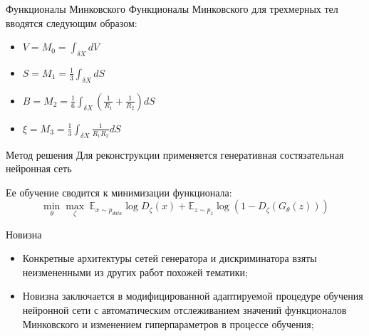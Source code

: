 \documentclass[10pt, handout, aspectratio=169]{beamer}
\begin{document}
	\begin{frame}{Функционалы Минковского}
		Функционалы Минковского для трехмерных тел вводятся следующим образом:
		\begin{itemize}
			\item $ \displaystyle V = M_0 = \int_{\delta X} dV $
			\item $ \displaystyle S = M_1 = \frac{1}{3} \int_{\delta X} dS $
			\item $ \displaystyle B = M_2 = \frac{1}{6} \int_{\delta X} \left ( \frac{1}{R_1} + \frac{1}{R_2} \right ) dS$
			\item $\displaystyle \xi = M_3 = \frac{1}{3} \int_{\delta X} \frac{1}{R_1 R_2} dS $
		\end{itemize}
	\end{frame}

	\begin{frame}{Метод решения}
		Для реконструкции применяется генеративная состязательная нейронная сеть
		\begin{figure}
		\end{figure}
		Ее обучение сводится к минимизации функционала:
		\[ \underset{\theta}{\min} \underset{\zeta}{\max} \ \mathbb{E}_{x \sim p_{data}}\log D_\zeta(x) + \mathbb{E}_{z \sim p_{z}} \log (1 - D_\zeta(G_\theta(z))) \]
	\end{frame}

	\begin{frame}{Новизна}
		\begin{itemize}
			\item Конкретные архитектуры сетей генератора и дискриминатора взяты неизмененными из других работ похожей тематики;
			\item Новизна заключается в модифицированной адаптируемой процедуре обучения нейронной сети с автоматическим отслеживанием значений функционалов Минковского и изменением гиперпараметров в процессе обучения;
		\end{itemize}
	\end{frame}
\end{document}
